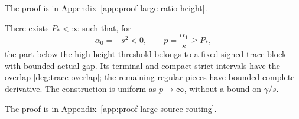 The proof is in Appendix~\ref{app:proof-large-ratio-height}.

\begin{lemma}
\label{deg:lem-large-source-routing}
There exists \(P_*<\infty\) such that, for
\[
 \alpha _0=-s^2<0,\qquad p=\frac{\alpha _1}{s}\ge P_*,
\]
the part below the high-height threshold belongs to a fixed signed
trace block with bounded actual gap. Its terminal and compact strict
intervals have the overlap \eqref{deg:trace-overlap}; the remaining
regular pieces have bounded complete derivative. The construction is
uniform as \(p\to\infty\), without a bound on \(\gamma/s\).
\end{lemma}

The proof is in Appendix~\ref{app:proof-large-source-routing}.
